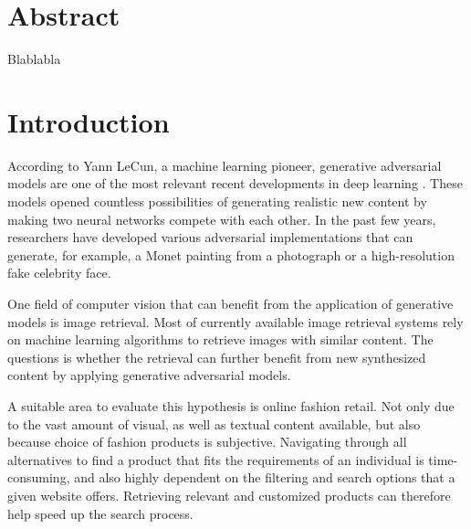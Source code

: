 \documentclass[12pt]{report}
\begin{document}


\chapter*{Abstract}
Blablabla
\clearpage

\pagestyle{plain}
\renewcommand{\baselinestretch}{0.75}\normalsize
\tableofcontents
\renewcommand{\baselinestretch}{1.0}\normalsize
\clearpage


\pagestyle{fancy}
\fancyhf{}
\lhead{\slshape\nouppercase{\rightmark}}
\rhead{ \thepage}
\renewcommand{\headrulewidth}{.5pt}
\chapter{Introduction}
According to Yann LeCun, a machine learning pioneer, generative adversarial models are one of the most relevant recent developments in deep learning \cite{yann_lecun_what_2016}. These models opened countless possibilities of generating realistic new content by making two neural networks compete with each other. In the past few years, researchers have developed various adversarial implementations that can generate, for example, a Monet painting from a photograph or  a high-resolution fake celebrity face.

One field of computer vision that can benefit from the application of generative models is image retrieval. Most of currently available image retrieval systems rely on machine learning algorithms to retrieve images with similar content.  The questions is whether the retrieval can further benefit from new synthesized content by applying generative adversarial models.

A suitable area to evaluate this hypothesis is online fashion retail. Not only due to the vast amount of visual, as well as textual content available, but also because choice of fashion products is subjective. Navigating through all alternatives to find a product that fits the requirements of an individual is time-consuming, and also highly dependent on the filtering and search options that a given website offers. Retrieving relevant and customized products can therefore help speed up the search process.
\end{document}
